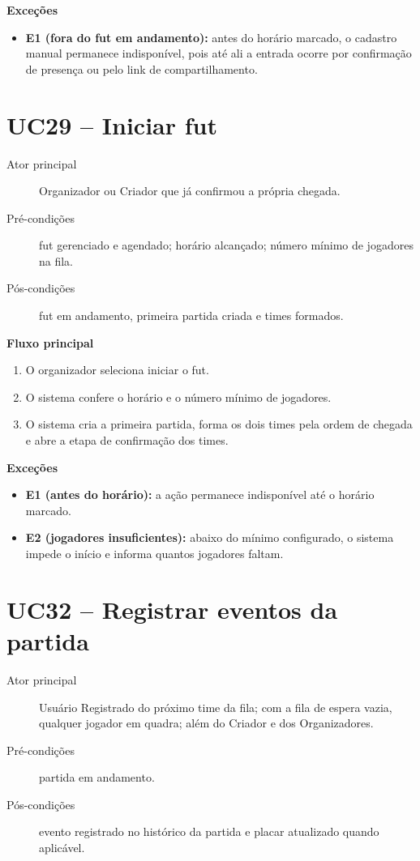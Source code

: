 \begin{apendicesenv}
        \noindent\textbf{Exceções}
        \begin{itemize}
            \item \textbf{E1 (fora do fut em andamento):} antes do horário marcado, o cadastro manual permanece indisponível, pois até ali a entrada ocorre por confirmação de presença ou pelo link de compartilhamento.
        \end{itemize}

    \section*{UC29 -- Iniciar fut}
        \begin{description}
            \item[Ator principal] Organizador ou Criador que já confirmou a própria chegada.
            \item[Pré-condições] fut gerenciado e agendado; horário alcançado; número mínimo de jogadores na fila.
            \item[Pós-condições] fut em andamento, primeira partida criada e times formados.
        \end{description}

        \noindent\textbf{Fluxo principal}
        \begin{enumerate}
            \item O organizador seleciona iniciar o fut.
            \item O sistema confere o horário e o número mínimo de jogadores.
            \item O sistema cria a primeira partida, forma os dois times pela ordem de chegada e abre a etapa de confirmação dos times.
        \end{enumerate}

        \noindent\textbf{Exceções}
        \begin{itemize}
            \item \textbf{E1 (antes do horário):} a ação permanece indisponível até o horário marcado.
            \item \textbf{E2 (jogadores insuficientes):} abaixo do mínimo configurado, o sistema impede o início e informa quantos jogadores faltam.
        \end{itemize}

    \section*{UC32 -- Registrar eventos da partida}
        \begin{description}
            \item[Ator principal] Usuário Registrado do próximo time da fila; com a fila de espera vazia, qualquer jogador em quadra; além do Criador e dos Organizadores.
            \item[Pré-condições] partida em andamento.
            \item[Pós-condições] evento registrado no histórico da partida e placar atualizado quando aplicável.
        \end{description}


\end{apendicesenv}
